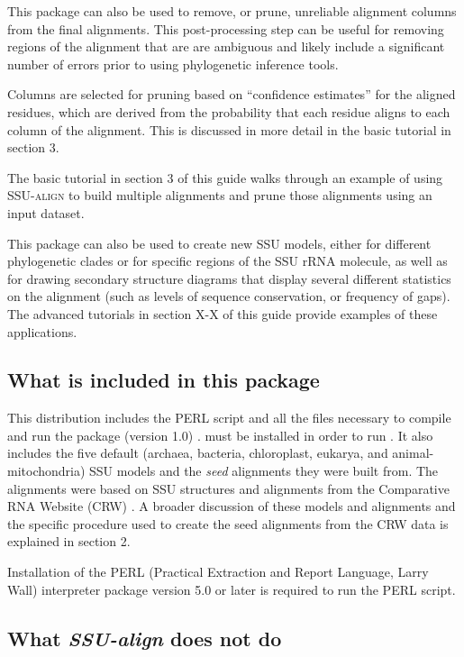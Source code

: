 This package can also be used to remove, or prune, unreliable
alignment columns from the final alignments.  This post-processing
step can be useful for removing regions of the alignment that are
are ambiguous and likely include a significant number of errors prior
to using phylogenetic inference tools.

Columns are selected for pruning based on ``confidence estimates'' 
for the aligned residues, which are derived from the probability that
each residue aligns to each column of the alignment. This is discussed
in more detail in the basic tutorial in section 3.

The basic tutorial in section 3 of this guide walks through an example
of using \textsc{SSU-align} to build multiple alignments and prune
those alignments using an input dataset. 

This package can also be used to create new SSU models, either for
different phylogenetic clades or for specific regions of the SSU rRNA
molecule, as well as for drawing secondary structure diagrams that
display several different statistics on the alignment (such as levels
of sequence conservation, or frequency of gaps). The advanced
tutorials in section X-X of this guide provide examples of these 
applications. 

\subsection{What is included in this package}

This distribution includes the PERL script  and
all the files necessary to compile and run the 
package (version 1.0) \cite{Nawrocki09}.  must be
installed in order to run .  It also includes the
five default (archaea, bacteria, chloroplast, eukarya, and
animal-mitochondria) SSU models and the \emph{seed} alignments they
were built from. The alignments were based on SSU structures and
alignments from the Comparative RNA Website (CRW) \cite{Cannone02}. A
broader discussion of these models and alignments and the specific
procedure used to create the seed alignments from the CRW data is
explained in section 2.

Installation of the PERL (Practical Extraction and Report Language,
Larry Wall) interpreter package version 5.0 or later is required to
run the  PERL script.

\subsection{What \emph{SSU-align} does not do}


